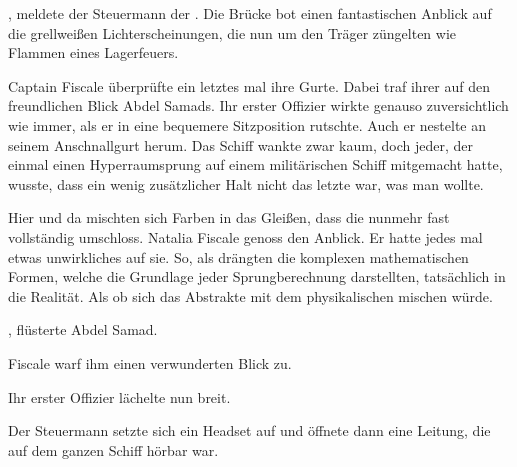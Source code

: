 , meldete der Steuermann der . Die Brücke bot einen fantastischen Anblick auf die grellweißen Lichterscheinungen, die nun um den Träger züngelten wie Flammen eines Lagerfeuers. 

\par

Captain Fiscale überprüfte ein letztes mal ihre Gurte. Dabei traf ihrer auf den freundlichen Blick Abdel Samads. Ihr erster Offizier wirkte genauso zuversichtlich wie immer, als er in eine bequemere Sitzposition rutschte. Auch er nestelte an seinem Anschnallgurt herum. Das Schiff wankte zwar kaum, doch jeder, der einmal einen Hyperraumsprung auf einem militärischen Schiff mitgemacht hatte, wusste, dass ein wenig zusätzlicher Halt nicht das letzte war, was man wollte.

\par

Hier und da mischten sich Farben in das Gleißen, dass die  nunmehr fast vollständig umschloss. Natalia Fiscale genoss den Anblick. Er hatte jedes mal etwas unwirkliches auf sie. So, als drängten die komplexen mathematischen Formen, welche die Grundlage jeder Sprungberechnung darstellten, tatsächlich in die Realität. Als ob sich das Abstrakte mit dem physikalischen mischen würde.

\par

, flüsterte Abdel Samad.

\par

Fiscale warf ihm einen verwunderten Blick zu. 

\par


\par


\par

Ihr erster Offizier lächelte nun breit. 

\par

Der Steuermann setzte sich ein Headset auf und öffnete dann eine Leitung, die auf dem ganzen Schiff hörbar war. 

